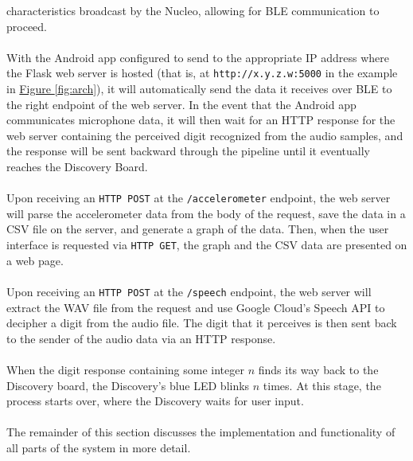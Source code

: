 characteristics broadcast by the Nucleo, allowing for BLE communication to proceed.\\\\
With the Android app configured to send to the appropriate IP address where the Flask web server is
hosted (that is, at \texttt{http://x.y.z.w:5000} in the example in \hyperref[fig:arch]{Figure \ref{fig:arch}}),
it will automatically send the data it receives over BLE to the right endpoint of the web server. In
the event that the Android app communicates microphone data, it will then wait for an HTTP response
for the web server containing the perceived digit recognized from the audio samples, and the
response will be sent backward through the pipeline until it eventually reaches the Discovery
Board.\\\\
Upon receiving an \texttt{HTTP POST} at the \texttt{/accelerometer} endpoint, the web server will
parse the accelerometer data from the body of the request, save the data in a CSV file on the
server, and generate a graph of the data. Then, when the user interface is requested via
\texttt{HTTP GET}, the graph and the CSV data are presented on a web page.\\\\
Upon receiving an \texttt{HTTP POST} at the \texttt{/speech} endpoint, the web server will extract
the WAV file from the request and use Google Cloud's Speech API to decipher a digit from the audio
file. The digit that it perceives is then sent back to the sender of the audio data via an HTTP
response.\\\\
When the digit response containing some integer $n$ finds its way back to the Discovery board, the
Discovery's blue LED blinks $n$ times. At this stage, the process starts over, where the Discovery
waits for user input.\\\\
The remainder of this section discusses the implementation and functionality of all parts of the
system in more detail.

